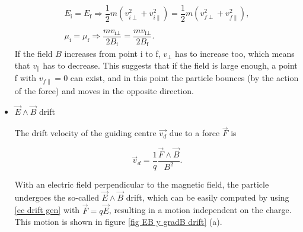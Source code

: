 \documentclass[a4paper,12pt,oneside]{book}
\begin{document}
\begin{itemize}
\begin{equation}\label{mirror conserv}
\begin{array}{c}
E_\text{i}=E_\text{f} \Rightarrow \dfrac{1}{2}m (v_{i \perp}^2+v_{i \parallel}^2)=\dfrac{1}{2}m (v_{f \perp}^2+v_{f \parallel}^2), \\
\\
\mu_\text{i}=\mu_\text{f} \Rightarrow \dfrac{mv_{\text{i} \perp}}{2B_\text{i}}=\dfrac{mv_{\text{f} \perp}}{2B_\text{f}}.
\end{array}
\end{equation}
%
If the field $B$ increases from point i to f, $v_{\perp}$ has to increase too, which means that $v_{\parallel}$ has to decrease. This suggests that if the field is large enough, a point f with $v_{f\parallel}=0$ can exist, and in this point the particle bounces (by the action of the force) and moves in the opposite direction.
%


\item $\vec{E} \wedge \vec{B}$ drift

The drift velocity of the guiding centre $\vec{v_d}$ due to a force $\vec{F}$ is 

\begin{equation}\label{ec drift gen}
\vec{v}_d=\dfrac{1}{q}\dfrac{\vec{F} \wedge \vec{B}}{B^2}.
\end{equation}

With an electric field perpendicular to the magnetic field, the particle undergoes the so-called $\vec{E} \wedge \vec{B}$ drift, which can be easily computed by using \eqref{ec drift gen} with $\vec{F}=q \vec{E}$, resulting in a motion independent on the charge. This motion is shown in figure  \ref{fig EB y gradB drift} (a).%



\end{itemize}
\end{document}
